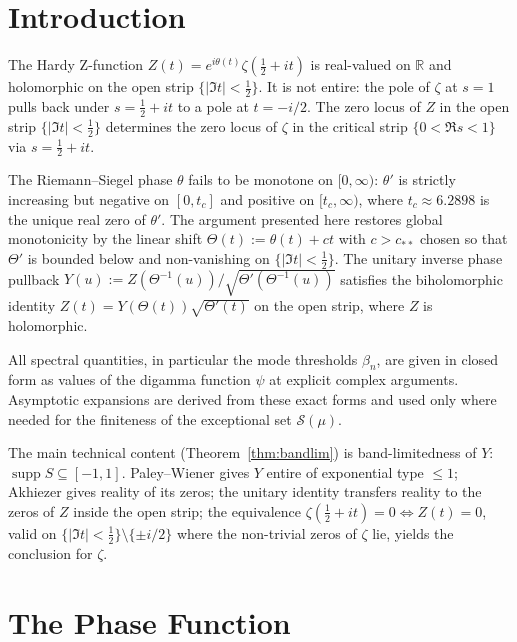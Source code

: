 \documentclass{article}
\newcommand{\assign}{:=}
\newcommand{\tmop}[1]{\ensuremath{\operatorname{#1}}}
\newcommand{\supp}{\tmop{supp}}
\begin{document}
{\tableofcontents}

\section{Introduction}

The Hardy Z-function $Z (t) = e^{i \theta (t)} \zeta (\tfrac{1}{2} + it)$ is
real-valued on $\mathbb{R}$ and holomorphic on the open strip $\{| \Im t| <
\tfrac{1}{2} \}$. It is not entire: the pole of $\zeta$ at $s = 1$ pulls back
under $s = \tfrac{1}{2} + it$ to a pole at $t = - i / 2$. The zero locus of
$Z$ in the open strip $\{| \Im t| < \tfrac{1}{2} \}$ determines the zero locus
of $\zeta$ in the critical strip $\{0 < \Re s < 1\}$ via $s = \tfrac{1}{2} +
it$.

The Riemann--Siegel phase $\theta$ fails to be monotone on $[0, \infty)$:
$\theta'$ is strictly increasing but negative on $[0, t_c]$ and positive on
$[t_c, \infty)$, where $t_c \approx 6.2898$ is the unique real zero of
$\theta'$. The argument presented here restores global monotonicity by the
linear shift $\Theta (t) \assign \theta (t) + ct$ with $c > c_{\ast \ast}$
chosen so that $\Theta'$ is bounded below and non-vanishing on $\{| \Im t| <
\tfrac{1}{2} \}$. The unitary inverse phase pullback $Y (u) \assign Z
(\Theta^{- 1} (u)) / \sqrt{\Theta' (\Theta^{- 1} (u))}$ satisfies the
biholomorphic identity $Z (t) = Y (\Theta (t)) \sqrt{\Theta' (t)}$ on the open
strip, where $Z$ is holomorphic.

All spectral quantities, in particular the mode thresholds $\beta_n$, are
given in closed form as values of the digamma function $\psi$ at explicit
complex arguments. Asymptotic expansions are derived from these exact forms
and used only where needed for the finiteness of the exceptional set
$\mathcal{S} (\mu)$.

The main technical content (Theorem~\ref{thm:bandlim}) is band-limitedness of
$Y$: $\supp S \subseteq [- 1, 1]$. Paley--Wiener gives $Y$ entire of
exponential type $\le 1$; Akhiezer gives reality of its zeros; the unitary
identity transfers reality to the zeros of $Z$ inside the open strip; the
equivalence $\zeta (\tfrac{1}{2} + it) = 0 \Longleftrightarrow Z (t) = 0$,
valid on $\{| \Im t| < \tfrac{1}{2} \} \setminus \{\pm i / 2\}$ where the
non-trivial zeros of $\zeta$ lie, yields the conclusion for $\zeta$.

\section{The Phase Function}
\end{document}
